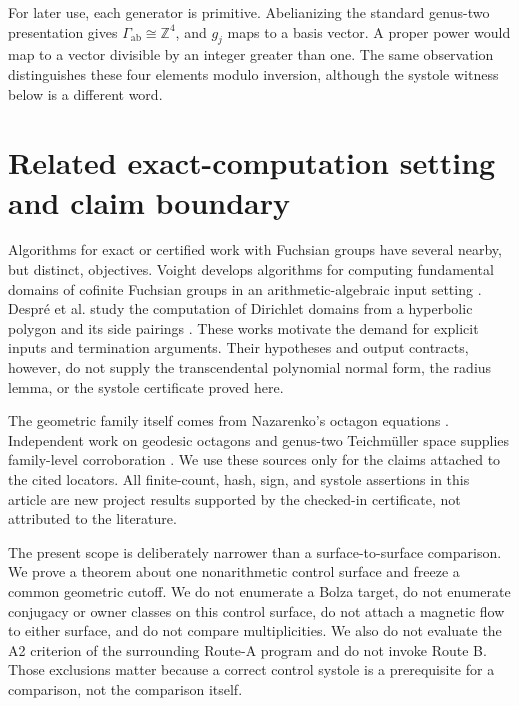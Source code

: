 \documentclass[11pt,a4paper]{article}
\theoremstyle{definition}
\newcommand{\Z}{\mathbb Z}
\begin{document}
For later use, each generator is primitive.  Abelianizing the standard
genus-two presentation gives \(\Gamma_{\mathrm{ab}}\cong\Z^4\), and \(g_j\)
maps to a basis vector.  A proper power would map to a vector divisible by an
integer greater than one.  The same observation distinguishes these four
elements modulo inversion, although the systole witness below is a different
word.

\section{Related exact-computation setting and claim boundary}

Algorithms for exact or certified work with Fuchsian groups have several
nearby, but distinct, objectives.  Voight develops algorithms for computing
fundamental domains of cofinite Fuchsian groups in an arithmetic-algebraic
input setting \cite[Secs.~1--4]{Voight2009}.  Despr\'{e} et al. study the
computation of Dirichlet domains from a hyperbolic polygon and its side
pairings \cite[Secs.~2--3]{DespreEtAl2023}.  These works motivate the demand
for explicit inputs and termination arguments.  Their hypotheses and output
contracts, however, do not supply the transcendental polynomial normal form,
the radius lemma, or the systole certificate proved here.

The geometric family itself comes from Nazarenko's octagon equations
\cite[eqs.~(10)--(18)]{Nazarenko2013}.  Independent work on geodesic
octagons and genus-two Teichm{\"u}ller space supplies family-level
corroboration \cite[abstract]{AigonDupuyEtAl2005}.  We use these sources only for the
claims attached to the cited locators.  All finite-count, hash, sign, and
systole assertions in this article are new project results supported by the
checked-in certificate, not attributed to the literature.

The present scope is deliberately narrower than a surface-to-surface
comparison.  We prove a theorem about one nonarithmetic control surface and
freeze a common geometric cutoff.  We do not enumerate a Bolza target, do not
enumerate conjugacy or owner classes on this control surface, do not attach a
magnetic flow to either surface, and do not compare multiplicities.  We also
do not evaluate the A2 criterion of the surrounding Route-A program and do
not invoke Route B.  Those exclusions matter because a correct control
systole is a prerequisite for a comparison, not the comparison itself.
\end{document}
